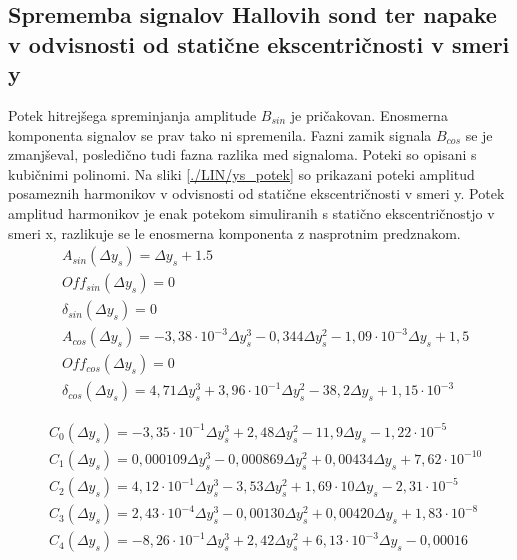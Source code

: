 \subsection{Sprememba signalov Hallovih sond ter napake v odvisnosti od statične ekscentričnosti v smeri y}

Potek hitrejšega spreminjanja amplitude $B_{sin}$ je pričakovan. Enosmerna komponenta signalov se prav tako ni spremenila. Fazni zamik signala $B_{cos}$ se je zmanjševal, posledično tudi fazna razlika med signaloma. Poteki so opisani s kubičnimi polinomi. Na sliki \ref{./LIN/ys_potek} so prikazani poteki amplitud posameznih harmonikov v odvisnosti od statične ekscentričnosti v smeri y.  Potek amplitud harmonikov je enak potekom simuliranih s statično ekscentričnostjo v smeri x, razlikuje se le enosmerna komponenta z nasprotnim predznakom.
\begin{eqnarray}
\label{analog_lin_ys}
&A_{sin}(\Delta y_s) = \Delta y_s+1.5\\
&Off_{sin}(\Delta y_s) = 0 \\
&\delta_{sin}(\Delta y_s) =0 \\
&A_{cos}(\Delta y_s) = -3,38\cdot 10^{-3} \Delta y_s^3-0,344\Delta y_s^2-1,09\cdot 10^{-3} \Delta y_s +1,5\\
&Off_{cos}(\Delta y_s) = 0 \\
&\delta_{cos}(\Delta y_s) = 4,71 \Delta y_s^3+3,96\cdot 10^{-1} \Delta y_s^2 - 38,2 \Delta y_s +1,15 \cdot 10^{-3}
\end{eqnarray}

\begin{eqnarray}
\label{nap_lin_ys}
&C_0(\Delta y_s) =-3,35\cdot 10^{-1}\Delta y_s^{3}+2,48\Delta y_s^{2}-11,9\Delta y_s-1,22\cdot 10^{-5}\\                  
&C_1(\Delta y_s) =0,000109\Delta y_s^{3}-0,000869\Delta y_s^{2}+0,00434\Delta y_s+7,62\cdot 10^{-10} \\
&C_2(\Delta y_s) =4,12\cdot 10^{-1}\Delta y_s^{3}-3,53\Delta y_s^{2}+1,69\cdot 10\Delta y_s-2,31\cdot 10^{-5} \\                   
&C_3(\Delta y_s) =2,43\cdot 10^{-4}\Delta y_s^{3}-0,00130\Delta y_s^{2}+0,00420\Delta y_s+1,83\cdot 10^{-8} \\ 
&C_4(\Delta y_s) =-8,26\cdot 10^{-1}\Delta y_s^{3}+2,42\Delta y_s^{2}+6,13\cdot 10^{-3}\Delta y_s-0,00016            
\end{eqnarray}

